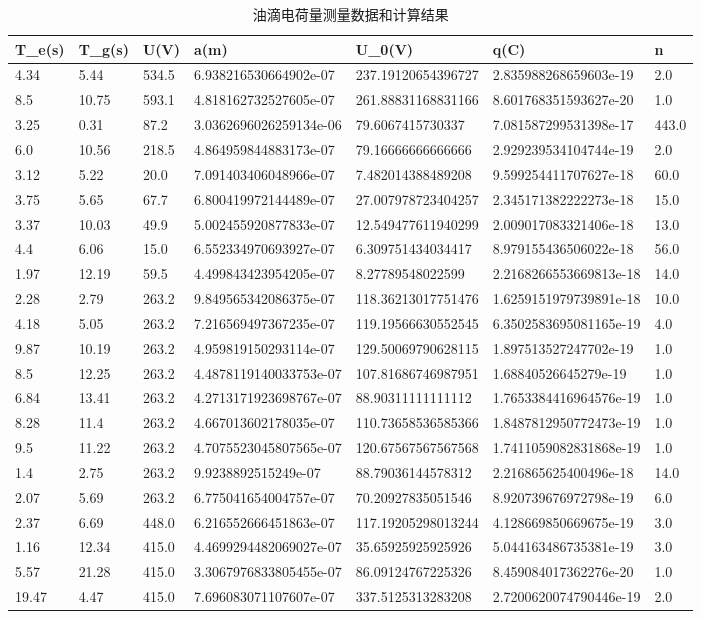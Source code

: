 \documentclass[UTF8]{ctexart}
\begin{document}
\begin{table}[htbp]
    \centering
    \caption{油滴电荷量测量数据和计算结果}
    \begin{tabular}{lllllll}
    \hline
    T\_e(s)&T\_g(s)&U(V)&a(m)&U\_0(V)&q(C)&n\\
    \hline
    4.34&5.44&534.5&6.938216530664902e-07&237.19120654396727&2.835988268659603e-19&2.0\\
    8.5&10.75&593.1&4.818162732527605e-07&261.88831168831166&8.601768351593627e-20&1.0\\
    3.25&0.31&87.2&3.0362696026259134e-06&79.6067415730337&7.081587299531398e-17&443.0\\
    6.0&10.56&218.5&4.864959844883173e-07&79.16666666666666&2.929239534104744e-19&2.0\\
    3.12&5.22&20.0&7.091403406048966e-07&7.482014388489208&9.599254411707627e-18&60.0\\
    3.75&5.65&67.7&6.800419972144489e-07&27.007978723404257&2.345171382222273e-18&15.0\\
    3.37&10.03&49.9&5.002455920877833e-07&12.549477611940299&2.009017083321406e-18&13.0\\
    4.4&6.06&15.0&6.552334970693927e-07&6.309751434034417&8.979155436506022e-18&56.0\\
    1.97&12.19&59.5&4.499843423954205e-07&8.27789548022599&2.2168266553669813e-18&14.0\\
    2.28&2.79&263.2&9.849565342086375e-07&118.36213017751476&1.6259151979739891e-18&10.0\\
    4.18&5.05&263.2&7.216569497367235e-07&119.19566630552545&6.3502583695081165e-19&4.0\\
    9.87&10.19&263.2&4.959819150293114e-07&129.50069790628115&1.897513527247702e-19&1.0\\
    8.5&12.25&263.2&4.4878119140033753e-07&107.81686746987951&1.68840526645279e-19&1.0\\
    6.84&13.41&263.2&4.2713171923698767e-07&88.90311111111112&1.7653384416964576e-19&1.0\\
    8.28&11.4&263.2&4.667013602178035e-07&110.73658536585366&1.8487812950772473e-19&1.0\\
    9.5&11.22&263.2&4.7075523045807565e-07&120.67567567567568&1.7411059082831868e-19&1.0\\
    1.4&2.75&263.2&9.9238892515249e-07&88.79036144578312&2.216865625400496e-18&14.0\\
    2.07&5.69&263.2&6.775041654004757e-07&70.20927835051546&8.920739676972798e-19&6.0\\
    2.37&6.69&448.0&6.216552666451863e-07&117.19205298013244&4.128669850669675e-19&3.0\\
    1.16&12.34&415.0&4.4699294482069027e-07&35.65925925925926&5.044163486735381e-19&3.0\\
    5.57&21.28&415.0&3.3067976833805455e-07&86.09124767225326&8.459084017362276e-20&1.0\\
    19.47&4.47&415.0&7.696083071107607e-07&337.5125313283208&2.7200620074790446e-19&2.0\\
    \hline
    \end{tabular}
    \end{table}
    
\end{document}
